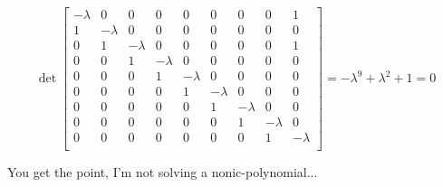 \documentclass{article}
\begin{document}
\begin{equation}
    \det
    \begin{bmatrix}
        -\lambda & 0        & 0        & 0        & 0        & 0        & 0        & 0        & 1        \\
        1        & -\lambda & 0        & 0        & 0        & 0        & 0        & 0        & 0        \\
        0        & 1        & -\lambda & 0        & 0        & 0        & 0        & 0        & 1        \\
        0        & 0        & 1        & -\lambda & 0        & 0        & 0        & 0        & 0        \\
        0        & 0        & 0        & 1        & -\lambda & 0        & 0        & 0        & 0        \\
        0        & 0        & 0        & 0        & 1        & -\lambda & 0        & 0        & 0        \\
        0        & 0        & 0        & 0        & 0        & 1        & -\lambda & 0        & 0        \\
        0        & 0        & 0        & 0        & 0        & 0        & 1        & -\lambda & 0        \\
        0        & 0        & 0        & 0        & 0        & 0        & 0        & 1        & -\lambda \\
    \end{bmatrix}
    = -\lambda^9 + \lambda^2 + 1 = 0
\end{equation}

You get the point, I'm not solving a nonic-polynomial...
\end{document}
